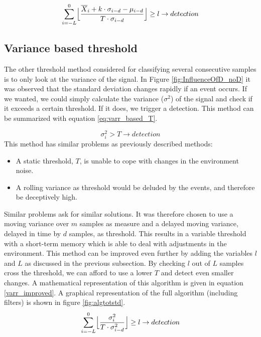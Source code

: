 \begin{equation}
\label{Zscore_improved}
\sum_{i = -L}^{0} \Bigl\lfloor{\frac{\overline{X}_i + k\cdot\sigma_{i-d} - \mu_{i-d}}{T \cdot \sigma_{i-d}}} \Bigr\rfloor \geq l \rightarrow detection 
\end{equation}


\subsection{Variance based threshold}
The other threshold method considered for classifying several consecutive samples is to only look at the variance of the signal. In Figure \ref{fig:InfluenceOfD_noD} it was observed that the standard deviation changes rapidly if an event occurs. If we wanted, we could simply calculate the variance ($\sigma^2$) of the signal and check if it exceeds a certain threshold. If it does, we trigger a detection. This method can be summarized with equation \ref{eq:varr_based_T}.

\begin{equation}
\label{eq:varr_based_T}
\sigma^2_i > T \rightarrow detection
\end{equation}
This method has similar problems as previously described methods:
\begin{itemize}[itemsep=-1ex,topsep=0pt]
	\item A static threshold, $T$, is unable to cope with changes in the environment noise.
	\item A rolling variance as threshold would be deluded by the events, and therefore be deceptively high.
\end{itemize}
Similar problems ask for similar solutions. It was therefore chosen to use a moving variance over $m$ samples as measure and a delayed moving variance, delayed in time by $d$ samples, as threshold. This results in a variable threshold with a short-term memory which is able to deal with adjustments in the environment. This method can be improved even further by adding the variables $l$ and $L$ as discussed in the previous subsection. By checking $l$ out of $L$ samples cross the threshold, we can afford to use a lower $T$ and detect even smaller changes. A mathematical representation of this algorithm is given in equation \ref{varr_improved}. A graphical representation of the full algorithm (including filters) is shown in figure \ref{fig:algtotstd}.
\begin{equation}
\label{varr_improved}
\sum_{i = -L}^{0} \Bigl\lfloor{\frac{\sigma^2_i}{T\cdot\sigma^2_{i-d}} }\Bigr\rfloor \geq l \rightarrow detection 
\end{equation}

